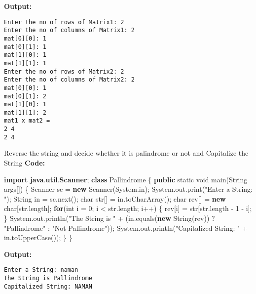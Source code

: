 \documentclass[
  12pt,
]{article}
\newenvironment{Shaded}{}{}
\newcommand{\BuiltInTok}[1]{\textcolor[rgb]{0.00,0.50,0.00}{#1}}
\newcommand{\ControlFlowTok}[1]{\textcolor[rgb]{0.00,0.44,0.13}{\textbf{#1}}}
\newcommand{\DataTypeTok}[1]{\textcolor[rgb]{0.56,0.13,0.00}{#1}}
\newcommand{\DecValTok}[1]{\textcolor[rgb]{0.25,0.63,0.44}{#1}}
\newcommand{\FunctionTok}[1]{\textcolor[rgb]{0.02,0.16,0.49}{#1}}
\newcommand{\ImportTok}[1]{\textcolor[rgb]{0.00,0.50,0.00}{\textbf{#1}}}
\newcommand{\KeywordTok}[1]{\textcolor[rgb]{0.00,0.44,0.13}{\textbf{#1}}}
\newcommand{\NormalTok}[1]{#1}
\newcommand{\OperatorTok}[1]{\textcolor[rgb]{0.40,0.40,0.40}{#1}}
\newcommand{\StringTok}[1]{\textcolor[rgb]{0.25,0.44,0.63}{#1}}
\begin{document}
\textbf{Output:}

\begin{verbatim}
Enter the no of rows of Matrix1: 2
Enter the no of columns of Matrix1: 2
mat[0][0]: 1
mat[0][1]: 1
mat[1][0]: 1
mat[1][1]: 1
Enter the no of rows of Matrix2: 2
Enter the no of columns of Matrix2: 2
mat[0][0]: 1
mat[0][1]: 2
mat[1][0]: 1
mat[1][1]: 2
mat1 x mat2 = 
2 4 
2 4 
\end{verbatim}

Reverse the string and decide whether it is palindrome or not and
Capitalize the String \textbf{Code:}

\begin{Shaded}
\begin{Highlighting}[numbers=left,,]
\KeywordTok{import} \ImportTok{java}\OperatorTok{.}\ImportTok{util}\OperatorTok{.}\ImportTok{Scanner}\OperatorTok{;}
\KeywordTok{class}\NormalTok{ Pallindrome}
\OperatorTok{\{}
    \KeywordTok{public} \DataTypeTok{static} \DataTypeTok{void} \FunctionTok{main}\OperatorTok{(}\BuiltInTok{String}\NormalTok{ args}\OperatorTok{[])}
    \OperatorTok{\{}
        \BuiltInTok{Scanner}\NormalTok{ sc }\OperatorTok{=} \KeywordTok{new} \BuiltInTok{Scanner}\OperatorTok{(}\BuiltInTok{System}\OperatorTok{.}\FunctionTok{in}\OperatorTok{);}
        \BuiltInTok{System}\OperatorTok{.}\FunctionTok{out}\OperatorTok{.}\FunctionTok{print}\OperatorTok{(}\StringTok{"Enter a String: "}\OperatorTok{);}
        \BuiltInTok{String}\NormalTok{ in }\OperatorTok{=}\NormalTok{ sc}\OperatorTok{.}\FunctionTok{next}\OperatorTok{();}
        \DataTypeTok{char}\NormalTok{ str}\OperatorTok{[]} \OperatorTok{=}\NormalTok{ in}\OperatorTok{.}\FunctionTok{toCharArray}\OperatorTok{();}
        \DataTypeTok{char}\NormalTok{ rev}\OperatorTok{[]} \OperatorTok{=} \KeywordTok{new} \DataTypeTok{char}\OperatorTok{[}\NormalTok{str}\OperatorTok{.}\FunctionTok{length}\OperatorTok{];}
        \ControlFlowTok{for}\OperatorTok{(}\DataTypeTok{int}\NormalTok{ i }\OperatorTok{=} \DecValTok{0}\OperatorTok{;}\NormalTok{ i }\OperatorTok{\textless{}}\NormalTok{ str}\OperatorTok{.}\FunctionTok{length}\OperatorTok{;}\NormalTok{ i}\OperatorTok{++)}
        \OperatorTok{\{}
\NormalTok{            rev}\OperatorTok{[}\NormalTok{i}\OperatorTok{]} \OperatorTok{=}\NormalTok{ str}\OperatorTok{[}\NormalTok{str}\OperatorTok{.}\FunctionTok{length} \OperatorTok{{-}} \DecValTok{1} \OperatorTok{{-}}\NormalTok{ i}\OperatorTok{];}
        \OperatorTok{\}}
        \BuiltInTok{System}\OperatorTok{.}\FunctionTok{out}\OperatorTok{.}\FunctionTok{println}\OperatorTok{(}\StringTok{"The String is "} \OperatorTok{+} \OperatorTok{(}\NormalTok{in}\OperatorTok{.}\FunctionTok{equals}\OperatorTok{(}\KeywordTok{new} \BuiltInTok{String}\OperatorTok{(}\NormalTok{rev}\OperatorTok{))} \OperatorTok{?} \StringTok{"Pallindrome"} \OperatorTok{:} \StringTok{"Not Pallindrome"}\OperatorTok{));}
        \BuiltInTok{System}\OperatorTok{.}\FunctionTok{out}\OperatorTok{.}\FunctionTok{println}\OperatorTok{(}\StringTok{"Capitalized String: "} \OperatorTok{+}\NormalTok{ in}\OperatorTok{.}\FunctionTok{toUpperCase}\OperatorTok{());}
    \OperatorTok{\}}
\OperatorTok{\}}
\end{Highlighting}
\end{Shaded}

\textbf{Output:}

\begin{verbatim}
Enter a String: naman
The String is Pallindrome
Capitalized String: NAMAN
\end{verbatim}
\end{document}
